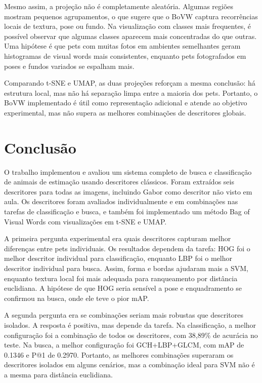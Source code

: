\documentclass[12pt,a4paper]{article}
\begin{document}
Mesmo assim, a projeção não é completamente aleatória. Algumas regiões mostram pequenos agrupamentos, o que sugere que o BoVW captura recorrências locais de textura, pose ou fundo. Na visualização com classes mais frequentes, é possível observar que algumas classes aparecem mais concentradas do que outras. Uma hipótese é que pets com muitas fotos em ambientes semelhantes geram histogramas de visual words mais consistentes, enquanto pets fotografados em poses e fundos variados se espalham mais.

Comparando t-SNE e UMAP, as duas projeções reforçam a mesma conclusão: há estrutura local, mas não há separação limpa entre a maioria dos pets. Portanto, o BoVW implementado é útil como representação adicional e atende ao objetivo experimental, mas não supera as melhores combinações de descritores globais.

\section{Conclusão}

O trabalho implementou e avaliou um sistema completo de busca e classificação de animais de estimação usando descritores clássicos. Foram extraídos seis descritores para todas as imagens, incluindo Gabor como descritor não visto em aula. Os descritores foram avaliados individualmente e em combinações nas tarefas de classificação e busca, e também foi implementado um método Bag of Visual Words com visualizações em t-SNE e UMAP.

A primeira pergunta experimental era quais descritores capturam melhor diferenças entre pets individuais. Os resultados dependem da tarefa: HOG foi o melhor descritor individual para classificação, enquanto LBP foi o melhor descritor individual para busca. Assim, forma e bordas ajudaram mais a SVM, enquanto textura local foi mais adequada para ranqueamento por distância euclidiana. A hipótese de que HOG seria sensível a pose e enquadramento se confirmou na busca, onde ele teve o pior mAP.

A segunda pergunta era se combinações seriam mais robustas que descritores isolados. A resposta é positiva, mas depende da tarefa. Na classificação, a melhor configuração foi a combinação de todos os descritores, com 38,89\% de acurácia no teste. Na busca, a melhor configuração foi GCH+LBP+GLCM, com mAP de 0.1346 e P@1 de 0.2970. Portanto, as melhores combinações superaram os descritores isolados em alguns cenários, mas a combinação ideal para SVM não é a mesma para distância euclidiana.
\end{document}
